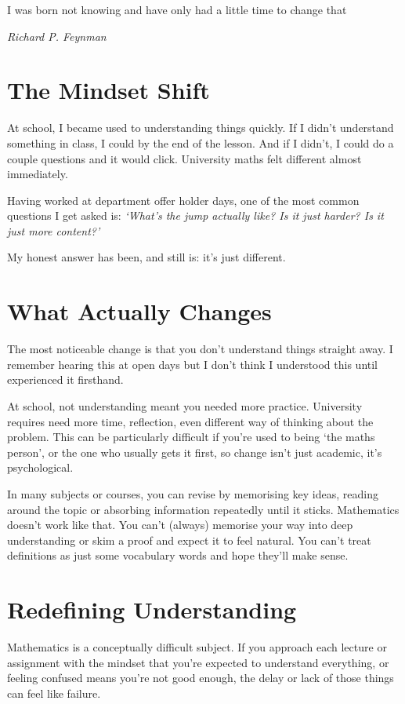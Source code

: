 \epigraph{I was born not knowing and have only had a little time to change that}
{\textit{Richard P. Feynman}}

\section{The Mindset Shift}

At school, I became used to understanding things quickly. If I didn’t understand something in class, I could by the end of the lesson. And if I didn’t, I could do a couple questions and it would click. University maths felt different almost immediately.

Having worked at department offer holder days, one of the most common questions I get asked is: \textit{`What’s the jump actually like? Is it just harder? Is it just more content?'}

My honest answer has been, and still is: it’s just different.

\section{What Actually Changes}

The most noticeable change is that you don’t understand things straight away. I remember hearing this at open days but I don't think I understood this until experienced it firsthand. 

At school, not understanding meant you needed more practice. University requires need more time, reflection, even different way of thinking about the problem. This can be particularly difficult if you’re used to being `the maths person', or the one who usually gets it first, so change isn’t just academic, it’s psychological.

In many subjects or courses, you can revise by memorising key ideas, reading around the topic or absorbing information repeatedly until it sticks. Mathematics doesn't work like that. You can't (always) memorise your way into deep understanding or skim a proof and expect it to feel natural. You can't treat definitions as just some vocabulary words and hope they'll make sense.  
 
\section{Redefining Understanding}

Mathematics is a conceptually difficult subject. If you approach each lecture or assignment with the mindset that you're expected to understand everything, or feeling confused means you're not good enough, the delay or lack of those things can feel like failure. 


